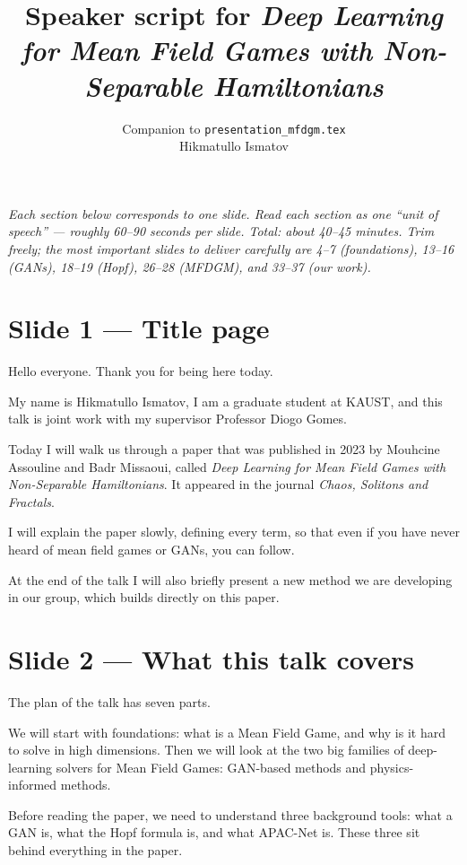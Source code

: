 \documentclass[11pt]{article}
\title{Speaker script for \emph{Deep Learning for Mean Field Games with Non-Separable Hamiltonians}}
\author{Companion to \texttt{presentation\_mfdgm.tex}\\
        Hikmatullo Ismatov}
\date{}
\begin{document}
\maketitle

\textit{Each section below corresponds to one slide.  Read each section as one
``unit of speech'' --- roughly 60--90 seconds per slide.  Total: about 40--45
minutes.  Trim freely; the most important slides to deliver carefully are
4--7 (foundations), 13--16 (GANs), 18--19 (Hopf), 26--28 (MFDGM), and 33--37
(our work).}

\section*{Slide 1 --- Title page}

Hello everyone. Thank you for being here today.

My name is Hikmatullo Ismatov, I am a graduate student at KAUST, and this talk
is joint work with my supervisor Professor Diogo Gomes.

Today I will walk us through a paper that was published in 2023 by
Mouhcine Assouline and Badr Missaoui, called \emph{Deep Learning for Mean
Field Games with Non-Separable Hamiltonians}. It appeared in the journal
\emph{Chaos, Solitons and Fractals}.

I will explain the paper slowly, defining every term, so that even if you
have never heard of mean field games or GANs, you can follow.

At the end of the talk I will also briefly present a new method we are
developing in our group, which builds directly on this paper.

\section*{Slide 2 --- What this talk covers}

The plan of the talk has seven parts.

We will start with foundations: what is a Mean Field Game, and why is it hard
to solve in high dimensions. Then we will look at the two big families of
deep-learning solvers for Mean Field Games: GAN-based methods and physics-
informed methods.

Before reading the paper, we need to understand three background tools:
what a GAN is, what the Hopf formula is, and what APAC-Net is. These three
sit behind everything in the paper.
\end{document}
